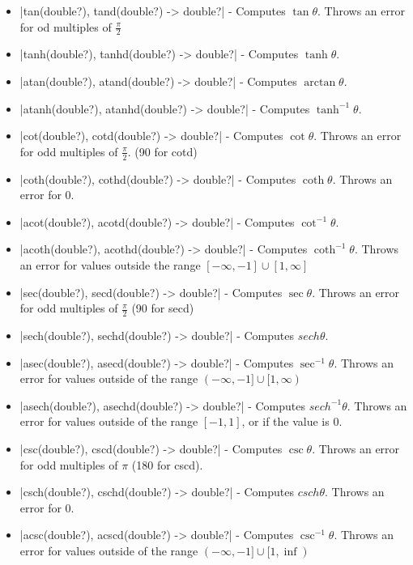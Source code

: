 \documentclass[12pt, letterpaper, oneside]{article}
\begin{document}
\begin{itemize}
\begin{itemize}
				\newline
				\item[--] \spverb|tan(double?), tand(double?) -> double?| - Computes $\tan\theta$. Throws an error for od multiples of $\frac{\pi}{2}$
				\item[--] \spverb|tanh(double?), tanhd(double?) -> double?| - Computes $\tanh\theta$.
				\item[--] \spverb|atan(double?), atand(double?) -> double?| - Computes $\arctan\theta$.
				\item[--] \spverb|atanh(double?), atanhd(double?) -> double?| - Computes $\tanh^{-1}\theta$.
				\newline
				\item[--] \spverb|cot(double?), cotd(double?) -> double?| - Computes $\cot\theta$. Throws an error for odd multiples of $\frac{\pi}{2}$. (90 for cotd)
				\item[--] \spverb|coth(double?), cothd(double?) -> double?| - Computes $\coth\theta$. Throws an error for 0.
				\item[--] \spverb|acot(double?), acotd(double?) -> double?| - Computes $\cot^{-1}\theta$.
				\item[--] \spverb|acoth(double?), acothd(double?) -> double?| - Computes $\coth^{-1}\theta$. Throws an error for values outside the range $[-\infty, -1]\cup[1,\infty]$	
				\newline
				\item[--] \spverb|sec(double?), secd(double?) -> double?| - Computes $\sec\theta$. Throws an error for odd multiples of $\frac{\pi}{2}$ (90 for secd)
				\item[--] \spverb|sech(double?), sechd(double?) -> double?| - Computes $sech\theta$.
				\item[--] \spverb|asec(double?), asecd(double?) -> double?| - Computes $\sec^{-1}\theta$. Throws an error for values outside of the range $(-\infty, -1]\cup[1,\infty)$
				\item[--] \spverb|asech(double?), asechd(double?) -> double?| - Computes $sech^{-1}\theta$. Throws an error for values outside of the range $[-1, 1]$, or if the value is 0.
				\newline
				\item[--] \spverb|csc(double?), cscd(double?) -> double?| - Computes $\csc\theta$. Throws an error for odd multiples of $\pi$ (180 for cscd).
				\item[--] \spverb|csch(double?), cschd(double?) -> double?| - Computes $csch\theta$. Throws an error for 0.
				\item[--] \spverb|acsc(double?), acscd(double?) -> double?| - Computes $\csc^{-1}\theta$. Throws an error for values outside of the range $(-\infty, -1]\cup[1,\inf)$

\end{itemize}
\end{itemize}
\end{document}

